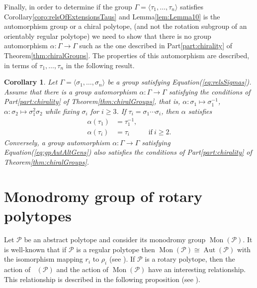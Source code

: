 \documentclass[final]{amsart}
\theoremstyle{plain}
\newtheorem{coro}[thm]{Corollary}
\theoremstyle{definition}
\theoremstyle{remark}
\numberwithin{equation}{section}
\renewcommand{\{}{\lbrace}
\renewcommand{\}}{\rbrace}
\newcommand{\cP}{\mathcal{P}}
\DeclareMathOperator{\aut}{Aut} \DeclareMathOperator{\autp}{\aut^{+}}
\DeclareMathOperator{\mon}{Mon}
\begin{document}
Finally, in order to determine if the group $\Gamma = \langle \tau_{1}, \dots, \tau_{n} \rangle$ satisfies Corollary\nobreakspace \ref {coro:relsOfExtensionsTaus} and Lemma\nobreakspace \ref {lem:Lemma10} is the automorphism group or a chiral polytope, (and not the rotation subgroup of an orientably regular polytope) we need to show that there is no group automorphism $\alpha:\Gamma \to \Gamma$ such as the one described in Part\nobreakspace \ref {part:chirality} of Theorem\nobreakspace \ref {thm:chiralGroups}. 
The properties of this automorphism are described, in terms of $\tau_{1}, \dots, \tau_{n}$ in the following result.



\begin{coro}\label{cor:gpAutAltGens}
	Let $\Gamma = \langle \sigma_{1}, \dots, \sigma_{n} \rangle$ be a group satisfying Equation\nobreakspace \textup {(\ref {eq:relsSigmas})}. Assume that there is a group automorphism $\alpha: \Gamma \to \Gamma$ satisfying the conditions of Part\nobreakspace \ref {part:chirality} of Theorem\nobreakspace \ref {thm:chiralGroups}, that is, $\alpha: \sigma_{1} \mapsto \sigma_{1}^{-1}$, $\alpha: \sigma_{2} \mapsto \sigma_{1}^{2} \sigma_{2} $ while fixing $\sigma_{i}$ for $i \geq 3$. If $\tau_{i} = \sigma_{1} \cdots \sigma_{i}$, then $\alpha$ satisfies
	\begin{equation}\label{eq:gpAutAltGens}
		\begin{aligned}
			\alpha(\tau_{1}) &= \tau_{1}^{-1}, \\
			\alpha(\tau_{i}) &= \tau_{i} && \text{if}\ i \geq 2.
		\end{aligned}
	\end{equation}
	Conversely, a group automorphism $\alpha:\Gamma \to \Gamma$ satisfying Equation\nobreakspace \textup {(\ref {eq:gpAutAltGens})} also satisfies the conditions of Part\nobreakspace \ref {part:chirality} of Theorem\nobreakspace \ref {thm:chiralGroups}.
\end{coro}


\section{Monodromy group of rotary polytopes}
Let $\cP$ be an abstract polytope and consider its monodromy group $\mon(\cP)$.
It is well-known that if $\cP$ is a regular polytope then $\mon(\cP) \cong \aut(\cP)$ with the isomorphism mapping $r_{i}$ to $\rho_{i}$ (see \cite[Theorem 3.9]{MonsonPellicerWilliams_2014_MixingMonodromyAbstract}). 
If $\cP$ is a rotary polytope, then the action of $\autp(\cP)$ and the action of $\mon(\cP)$ have an interesting relationship.
This relationship is described in the following proposition (see \cite[Lemma 2.5 and Proposition 2.7]{Pellicer_2010_ConstructionHigherRank}).
\end{document}
